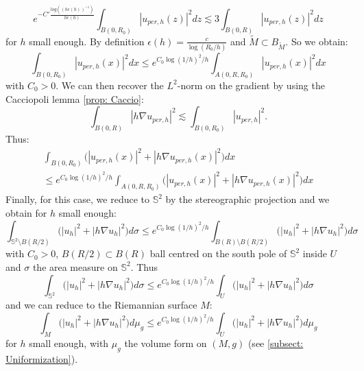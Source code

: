 \documentclass[leqno,11pt,letterpaper, english]{amsart}
\theoremstyle{plain}
\theoremstyle{definition}
\numberwithin{equation}{section}
\def\S{\mathbb S}
\begin{document}
\begin{itemize}
\begin{equation}
	e^{-C' \frac{log((h\epsilon(h))^{-1})}{h\epsilon(h)}}\int_{B(0,R_0)}  |u_{per,h}(z)|^2 dz     
	\lesssim 3\int_{B(0,R)} \left|u_{per,h}(z)\right|^2dz
\end{equation}
for $h$ small enough. By definition $\epsilon(h) = \frac{c}{\log(R_0/h)}$ and $\tilde{M}\subset B_{\tilde{M}}$. So we obtain:
\begin{equation}
	\int_{B(0,R_0)} |u_{per,h}(x)|^2dx
	\leq e^{C_0\log(1/h)^{2}/h}\int_{A(0,R,R_0)} |u_{per,h}(x)|^2 dx
\end{equation}
with $C_0 > 0$.
We can then recover the $L^2$-norm on the gradient by using the Cacciopoli lemma \ref{prop: Caccio}:
\begin{equation}
	\int_{B(0,R)}|h\nabla u_{per,h}|^2\lesssim \int_{B(0,R_0)}|u_{per,h}|^2. 
\end{equation}
Thus:
\begin{multline}
		\int_{B(0,R_0)} \Big(|u_{per,h}(x)|^2+ |h\nabla u_{per,h}(x)|^2 \Big)dx\\
	\leq e^{C_0\log(1/h)^{2}/h}\int_{A(0,R,R_0)} \Big(|u_{per,h}(x)|^2+ |h\nabla u_{per,h}(x)|^2 \Big)dx
\end{multline}
 Finally, for this case, we reduce to $\S^2$ by the stereographic projection and we obtain for $h$ small enough:
\begin{equation}
	\int_{\S^2\setminus B(R/2)} \Big(|u_{h}|^2+ |h\nabla u_{h}|^2 \Big)d\sigma
	\leq e^{C_0\log(1/h)^{2}/h}\int_{B(R)\setminus B(R/2)} \Big(|u_{h}|^2+ |h\nabla u_{h}|^2 \Big)d\sigma
\end{equation}
with $C_0 > 0$, $B(R/2)\subset B(R)$ ball centred on the south pole of $\S^2$ inside $U$ and $\sigma$ the area measure on $\S^2$. Thus
\begin{equation}
	\int_{\S^2} \Big(|u_{h}|^2+ |h\nabla u_{h}|^2 \Big)d\sigma
	\leq e^{C_0\log(1/h)^{2}/h}\int_{U} \Big(|u_{h}|^2+ |h\nabla u_{h}|^2 \Big)d\sigma
\end{equation}
and we can reduce to the Riemannian surface $M$:
\begin{equation}
	\int_{M}\Big(|u_{h}|^2+ |h\nabla u_{h}|^2 \Big)d\mu_g
	\leq e^{C_0\log(1/h)^{2}/h}\int_{U} \Big(|u_{h}|^2+ |h\nabla u_{h}|^2 \Big)d\mu_g
\end{equation}
for $h$ small enough, with $\mu_g$ the volume form on $(M,g)$ (see \ref{subsect: Uniformization}).


\end{itemize}
\end{document}
